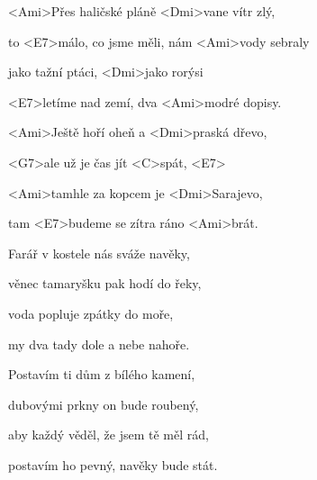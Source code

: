 

\zs
<Ami>Přes haličské pláně <Dmi>vane vítr zlý,

to <E7>málo, co jsme měli, nám <Ami>vody sebraly

jako tažní ptáci, <Dmi>jako rorýsi

<E7>letíme nad zemí, dva <Ami>modré dopisy.
\ks


\zr
<Ami>Ještě hoří oheň a <Dmi>praská dřevo,

<G7>ale už je čas jít <C>spát, <E7>

<Ami>tamhle za kopcem je <Dmi>Sarajevo,

tam <E7>budeme se zítra ráno <Ami>brát.
\kr

\zs
Farář v kostele nás sváže navěky,

věnec tamaryšku pak hodí do řeky,

voda popluje zpátky do moře,

my dva tady dole a nebe nahoře.
\ks

\zr \kr

\zs
Postavím ti dům z bílého kamení,

dubovými prkny on bude roubený,

aby každý věděl, že jsem tě měl rád,

postavím ho pevný, navěky bude stát.
\ks


\zr \kr

\kp





